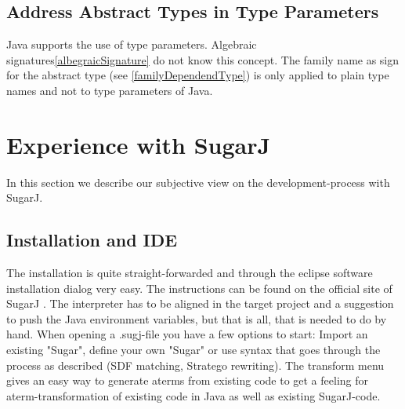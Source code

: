 \documentclass{report}
\begin{document}
\subsection{Address Abstract Types in Type Parameters}

Java supports the use of type parameters. Algebraic signatures\ref{albegraicSignature} do not know this concept. The family name as sign for the abstract type (see \ref{familyDependendType}) is only applied to plain type names and not to type parameters of Java.

\section{Experience with SugarJ}
In this section we describe our subjective view on the development-process with SugarJ.

\subsection{Installation and IDE}
The installation is quite straight-forwarded and through the eclipse software installation dialog very easy. The instructions can be found on the official site of SugarJ \cite{SugarJ-Homepage}. The interpreter has to be aligned in the target project and a suggestion to push the Java environment variables, but that is all, that is needed to do by hand. When opening a .sugj-file you have a few options to start: Import an existing "Sugar", define your own "Sugar" or use syntax that goes through the process as described (SDF matching, Stratego rewriting). The transform menu gives an easy way to generate aterms from existing code to get a feeling for aterm-transformation of existing code in Java as well as existing SugarJ-code.
\end{document}
